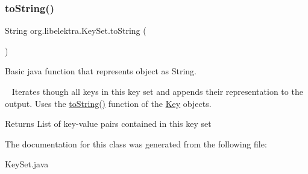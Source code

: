 \subsubsection{\texorpdfstring{toString()}{toString()}}
{\footnotesize\ttfamily String org.\+libelektra.\+Key\+Set.\+to\+String (\begin{DoxyParamCaption}{ }\end{DoxyParamCaption})\hspace{0.3cm}{\ttfamily [inline]}}



Basic java function that represents object as String. 

~\newline
 Iterates though all keys in this key set and appends their representation to the output. Uses the \mbox{\hyperlink{classorg_1_1libelektra_1_1KeySet_a9c1e2918acce8c7cda5be406989c87af}{to\+String()}} function of the \mbox{\hyperlink{classorg_1_1libelektra_1_1Key}{Key}} objects.

\begin{DoxyReturn}{Returns}
List of key-\/value pairs contained in this key set 
\end{DoxyReturn}


The documentation for this class was generated from the following file\+:\begin{DoxyCompactItemize}
\item 
Key\+Set.\+java\end{DoxyCompactItemize}
